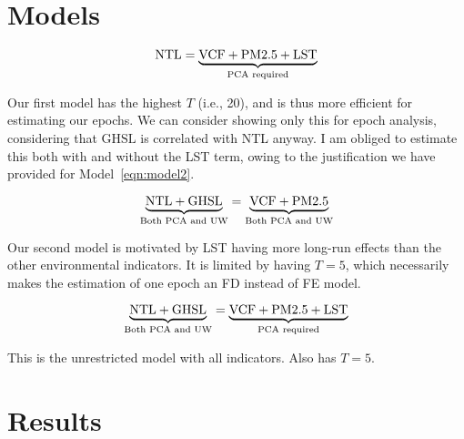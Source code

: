 \documentclass[a4paper,12pt]{article} %
\begin{document}
\section{Models}

\begin{equation}
    \rm{NTL} = \underbrace{\rm{VCF} + \rm{PM2.5} + \rm{LST}}_{\text{PCA required}}
\label{eqn:model1}
\end{equation}

Our first model has the highest $T$ (i.e., 20), and is thus more efficient for estimating our epochs. We can consider showing only this for epoch analysis, considering that $\text{GHSL}$ is correlated with NTL anyway. I am obliged to estimate this both with and without the LST term, owing to the justification we have provided for Model~\ref{eqn:model2}.


\begin{equation}
    \underbrace{\rm{NTL} + \rm{GHSL}}_{\text{Both PCA and UW}} = \underbrace{\rm{VCF} + \rm{PM2.5}}_{\text{Both PCA and UW}}
\label{eqn:model2}
\end{equation}

Our second model is motivated by LST having more long-run effects than the other environmental indicators. It is limited by having $T = 5$, which necessarily makes the estimation of one epoch an FD instead of FE model.


\begin{equation}
    \underbrace{\rm{NTL} + \rm{GHSL}}_{\text{Both PCA and UW}} = \underbrace{\rm{VCF} + \rm{PM2.5} + \rm{LST}}_{\text{PCA required}}
\label{eqn:model3}
\end{equation}

This is the unrestricted model with all indicators. Also has $T = 5$.


\section{Results}

\end{document}
